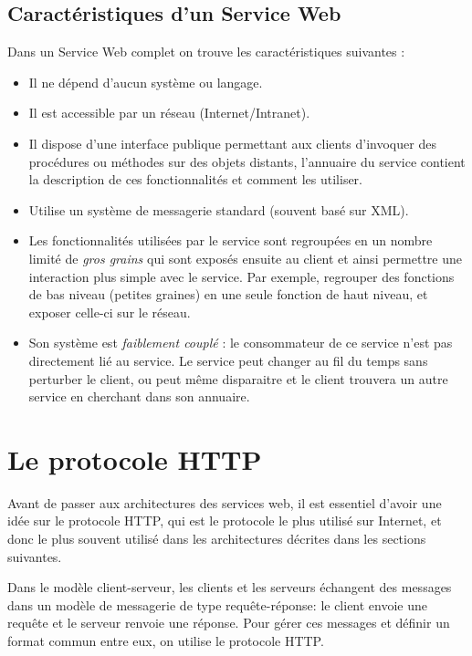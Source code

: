 			
\subsection{Caractéristiques d'un Service Web}
Dans un Service Web complet on trouve les caractéristiques suivantes :\cite{refTutorialPointsWS}
\begin{itemize}
	\item Il ne dépend d'aucun système ou langage.
	\item Il est accessible par un réseau (Internet/Intranet).
	\item Il dispose d'une interface publique permettant aux clients d'invoquer des procédures ou méthodes sur des objets distants, l'annuaire du service contient la description de ces fonctionnalités et comment les utiliser.
	\item Utilise un système de messagerie standard (souvent basé sur XML).
	\item Les fonctionnalités utilisées par le service sont regroupées en un nombre limité de \emph{gros grains} qui sont exposés ensuite au client et ainsi permettre une interaction plus simple avec le service. Par exemple, regrouper des fonctions de bas niveau (petites graines) en une seule fonction de haut niveau, et exposer celle-ci sur le réseau.
	\item Son système est \emph{faiblement couplé} : le consommateur de ce service n'est pas directement lié au service. Le service peut changer au fil du temps sans perturber le client, ou peut même disparaitre et le client trouvera un autre service en cherchant dans son annuaire.
\end{itemize}
		
\newpage
\section{Le protocole HTTP}
Avant de passer aux architectures des services web, il est essentiel d'avoir une idée sur le protocole HTTP, qui est le protocole le plus utilisé sur Internet, et donc le plus souvent utilisé dans les architectures décrites dans les sections suivantes.

Dans le modèle client-serveur, les clients et les serveurs échangent des messages dans un modèle de messagerie de type requête-réponse: le client envoie une requête et le serveur renvoie une réponse.
Pour gérer ces messages et définir un format commun entre eux, on utilise le protocole HTTP\cite{HTTP}.

